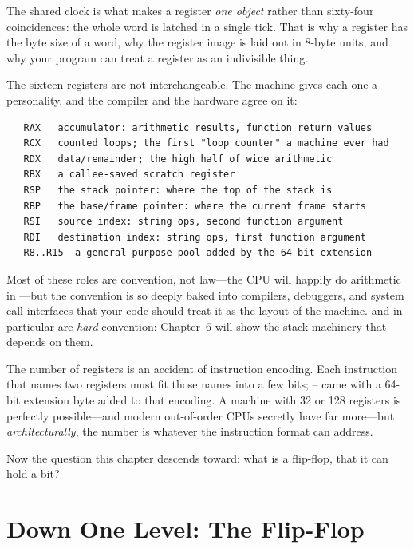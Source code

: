 The shared clock is what makes a register \emph{one object} rather
than sixty-four coincidences: the whole word is latched in a single
tick. That is why a register has the byte size of a word, why the
register image is laid out in 8-byte units, and why your program can
treat a register as an indivisible thing.

The sixteen registers are not interchangeable. The machine gives each
one a personality, and the compiler and the hardware agree on it:

\begin{verbatim}
   RAX   accumulator: arithmetic results, function return values
   RCX   counted loops; the first "loop counter" a machine ever had
   RDX   data/remainder; the high half of wide arithmetic
   RBX   a callee-saved scratch register
   RSP   the stack pointer: where the top of the stack is
   RBP   the base/frame pointer: where the current frame starts
   RSI   source index: string ops, second function argument
   RDI   destination index: string ops, first function argument
   R8..R15  a general-purpose pool added by the 64-bit extension
\end{verbatim}

Most of these roles are convention, not law---the CPU will happily do
arithmetic in ---but the convention is so deeply baked into
compilers, debuggers, and system call interfaces that your code
should treat it as the layout of the machine.  and
 in particular are \emph{hard} convention: Chapter~6 will
show the stack machinery that depends on them.

\begin{insight}
The number of registers is an accident of instruction encoding. Each
instruction that names two registers must fit those names into a few
bits; -- came with a 64-bit extension byte added
to that encoding. A machine with 32 or 128 registers is perfectly
possible---and modern out-of-order CPUs secretly have far more---but
\emph{architecturally}, the number is whatever the instruction format
can address.
\end{insight}

Now the question this chapter descends toward: what is a flip-flop,
that it can hold a bit?

\section{Down One Level: The Flip-Flop}
\label{sec:flipflop}

